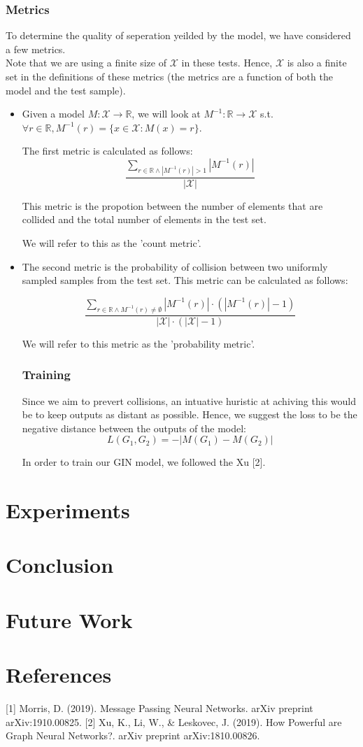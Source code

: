 \documentclass{article}
\begin{document}
\section*{Metrics}
To determine the quality of seperation yeilded by the model, we have considered a few metrics.\\
Note that we are using a finite size of $\mathcal{X}$ in these tests. Hence, $\mathcal{X}$
is also a finite set in the definitions of these metrics (the metrics are a function of both the model and the test sample).
\begin{itemize}
    \item Given a model $M:\mathcal{X}\rightarrow\mathbb{R}$, 
    we will look at $M^{-1}:\mathbb{R}\rightarrow\mathcal{X}$ s.t. 
    $\forall r\in\mathbb{R}, M^{-1}(r)=\{x\in\mathcal{X}:M(x)=r\}$.

    The first metric is calculated as follows:
    \[
        \frac{\sum_{r\in\mathbb{R}\wedge |M^{-1}(r)|>1}|M^{-1}(r)|}
        {|\mathcal{X}|}
    \]

    This metric is the propotion between the number of elements 
    that are collided and the total number of elements in the test set.
    
    We will refer to this as the 'count metric'.

    \item The second metric is the probability of collision
    between two uniformly sampled samples from the test set.
    This metric can be calculated as follows:

    \[
        \frac{\sum_{r\in\mathbb{R}\wedge M^{-1}(r)\neq\emptyset}|M^{-1}(r)|\cdot\left(|M^{-1}(r)|-1\right)}
        {|\mathcal{X}|\cdot\left(|\mathcal{X}|-1\right)}
    \]

    We will refer to this metric as the 'probability metric'.


    \section*{Training}
    Since we aim to prevert collisions, an intuative huristic at achiving this would be to keep
    outputs as distant as possible.
    Hence, we suggest the loss to be the negative distance between the outputs of the model:
    \[
        L(G_1,G_2)=-|M(G_1)-M(G_2)|    
    \]

    In order to train our GIN model, we followed the Xu [2].


\end{itemize}

\part*{Experiments}

\part*{Conclusion}

\part*{Future Work}

\part*{References}
[1] Morris, D. (2019). Message Passing Neural Networks. arXiv preprint arXiv:1910.00825.
[2] Xu, K., Li, W., \& Leskovec, J. (2019). How Powerful are Graph Neural Networks?. arXiv preprint arXiv:1810.00826.
\end{document}
